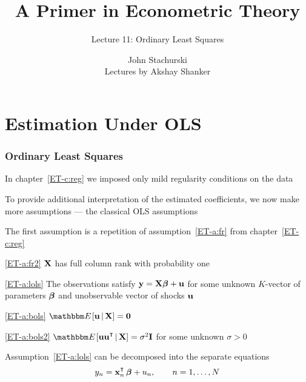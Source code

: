 





\title{A Primer in Econometric Theory}

\subtitle
{Lecture 11: Ordinary Least Squares}

\author{John Stachurski \\ \tiny Lectures by Akshay Shanker}







\begin{frame}
  \titlepage
\end{frame}


\section{Estimation Under OLS}

\begin{frame}\frametitle{Ordinary Least Squares}

    \vspace{2em}
    In chapter~\ref{ET-c:reg} we imposed only mild regularity
    conditions on the data
    
    To provide additional
    interpretation of the estimated coefficients, we now make more
    assumptions --- the classical OLS assumptions
    
    The first assumption is a repetition of assumption~\ref{ET-a:fr} from
    chapter~\ref{ET-c:reg}
    
    \Ass
    \eqref{ET-a:fr2}
    $\mathbf X$ has full column rank with probability one

\end{frame}

\begin{frame}
    
    \vspace{2em}
    \Ass
    \eqref{ET-a:lols}
    The observations satisfy ${\mathbf y} = \mathbf X {\boldsymbol \beta} + {\mathbf u}$ for some 
    unknown $K$-vector of parameters ${\boldsymbol \beta}$ and unobservable vector of
    shocks ${\mathbf u}$
    
    \vspace{.7em}
    \Ass
    \eqref{ET-a:bols}
    $\EE [ \boldu \given \boldX ] = \boldzero$
    
    \vspace{.7em}      
    \Ass
    \eqref{ET-a:bols2}
    $\EE [ \boldu \boldu^\T \given \boldX ] = \sigma^2 \boldI$ for some
    unknown $\sigma > 0$
    
    \vspace{.7em}
    Assumption~\ref{ET-a:lols} can be decomposed into the
    separate equations 
    \begin{equation}
        \label{eq:lm}
        y_n = \boldx_n^\T \, \boldbeta + u_n,
        \qquad n = 1, \ldots, N
    \end{equation}

        
\end{frame}


